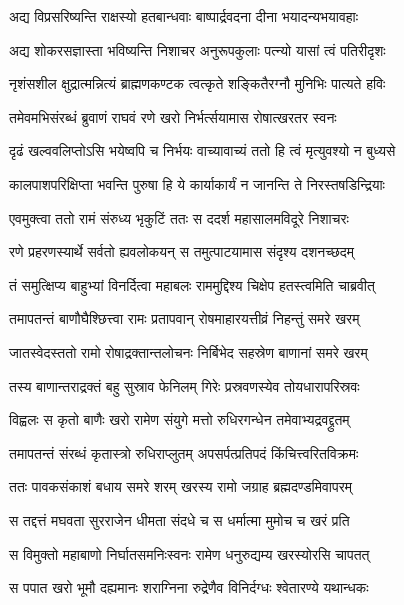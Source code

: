 \twolineshloka
{अद्य विप्रसरिष्यन्ति राक्षस्यो हतबान्धवाः}
{बाष्पार्द्रवदना दीना भयादन्यभयावहाः} %

\twolineshloka
{अद्य शोकरसज्ञास्ता भविष्यन्ति निशाचर}
{अनुरूपकुलाः पत्न्यो यासां त्वं पतिरीदृशः} %

\twolineshloka
{नृशंसशील क्षुद्रात्मन्नित्यं ब्राह्मणकण्टक}
{त्वत्कृते शङ्कितैरग्नौ मुनिभिः पात्यते हविः} %

\twolineshloka
{तमेवमभिसंरब्धं ब्रुवाणं राघवं रणे}
{खरो निर्भर्त्सयामास रोषात्खरतर स्वनः} %

\twolineshloka
{दृढं खल्ववलिप्तोऽसि भयेष्वपि च निर्भयः}
{वाच्यावाच्यं ततो हि त्वं मृत्युवश्यो न बुध्यसे} %

\twolineshloka
{कालपाशपरिक्षिप्ता भवन्ति पुरुषा हि ये}
{कार्याकार्यं न जानन्ति ते निरस्तषडिन्द्रियाः} %

\twolineshloka
{एवमुक्त्वा ततो रामं संरुध्य भृकुटिं ततः}
{स ददर्श महासालमविदूरे निशाचरः} %

\twolineshloka
{रणे प्रहरणस्यार्थे सर्वतो ह्यवलोकयन्}
{स तमुत्पाटयामास संदृश्य दशनच्छदम्} %

\twolineshloka
{तं समुत्क्षिप्य बाहुभ्यां विनर्दित्वा महाबलः}
{राममुद्दिश्य चिक्षेप हतस्त्वमिति चाब्रवीत्} %

\twolineshloka
{तमापतन्तं बाणौघैश्छित्त्वा रामः प्रतापवान्}
{रोषमाहारयत्तीव्रं निहन्तुं समरे खरम्} %

\twolineshloka
{जातस्वेदस्ततो रामो रोषाद्रक्तान्तलोचनः}
{निर्बिभेद सहस्रेण बाणानां समरे खरम्} %

\twolineshloka
{तस्य बाणान्तराद्रक्तं बहु सुस्राव फेनिलम्}
{गिरेः प्रस्रवणस्येव तोयधारापरिस्रवः} %

\twolineshloka
{विह्वलः स कृतो बाणैः खरो रामेण संयुगे}
{मत्तो रुधिरगन्धेन तमेवाभ्यद्रवद्द्रुतम्} %

\twolineshloka
{तमापतन्तं संरब्धं कृतास्त्रो रुधिराप्लुतम्}
{अपसर्पत्प्रतिपदं किंचित्त्वरितविक्रमः} %

\twolineshloka
{ततः पावकसंकाशं बधाय समरे शरम्}
{खरस्य रामो जग्राह ब्रह्मदण्डमिवापरम्} %

\twolineshloka
{स तद्दत्तं मघवता सुरराजेन धीमता}
{संदधे च स धर्मात्मा मुमोच च खरं प्रति} %

\twolineshloka
{स विमुक्तो महाबाणो निर्घातसमनिःस्वनः}
{रामेण धनुरुद्यम्य खरस्योरसि चापतत्} %

\twolineshloka
{स पपात खरो भूमौ दह्यमानः शराग्निना}
{रुद्रेणैव विनिर्दग्धः श्वेतारण्ये यथान्धकः} %

